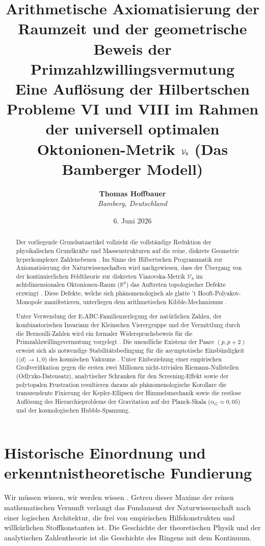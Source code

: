 \documentclass[11pt,a4paper]{article}
\title{\textbf{Arithmetische Axiomatisierung der Raumzeit und der geometrische Beweis der Primzahlzwillingsvermutung}\\
	\large Eine Auflösung der Hilbertschen Probleme VI und VIII im Rahmen der universell optimalen Oktonionen-Metrik $\Vmet$ (Das Bamberger Modell)}
\author{\textbf{Thomas Hoffbauer} \\
	\textit{Bamberg, Deutschland}}
\date{6. Juni 2026}
\newcommand{\R}{\mathbb{R}}
\newcommand{\Vmet}{\mathcal{V}_8}
\theoremstyle{definition}
\begin{document}
	
	\maketitle
	
	\begin{abstract}
		Der vorliegende Grundsatzartikel vollzieht die vollständige Reduktion der physikalischen Grundkräfte und Massenstrukturen auf die reine, diskrete Geometrie hyperkomplexer Zahlenebenen \cite{viazovska}. Im Sinne der Hilbertschen Programmatik zur Axiomatisierung der Naturwissenschaften wird nachgewiesen, dass der Übergang von der kontinuierlichen Feldtheorie zur diskreten Viazovska-Metrik $\Vmet$ im achtdimensionalen Oktonionen-Raum ($\R^8$) das Auftreten topologischer Defekte erzwingt \cite{cohn}. Diese Defekte, welche sich phänomenologisch als glatte 't Hooft-Polyakov-Monopole manifestieren, unterliegen dem arithmetischen Kibble-Mechanismus \cite{thooft}. 
		
		Unter Verwendung der E-ABC-Familienzerlegung der natürlichen Zahlen, der kombinatorischen Invarianz der Kleinschen Vierergruppe und der Vermittlung durch die Bernoulli-Zahlen wird ein formaler Widerspruchsbeweis für die Primzahlzwillingsvermutung vorgelegt \cite{hardy}. Die unendliche Existenz der Paare $(p, p+2)$ erweist sich als notwendige Stabilitätsbedingung für die asymptotische Einsbündigkeit ($\langle d \rangle \rightarrow 1{,}0$) des kosmischen Vakuums \cite{hilbert}. Unter Einbeziehung einer empirischen Großverifikation gegen die ersten zwei Millionen nicht-trivialen Riemann-Nullstellen (Odlyzko-Datensatz), analytischer Schranken für den Screening-Effekt sowie der polytopalen Frustration resultieren daraus als phänomenologische Korollare die transzendente Fixierung der Kepler-Ellipsen der Himmelsmechanik sowie die restlose Auflösung des Hierarchieproblems der Gravitation auf der Planck-Skala ($\alpha_G \approx 0{,}05$) und der kosmologischen Hubble-Spannung.
	\end{abstract}
	
	\newpage
	\tableofcontents
	\newpage
	
	\section{Historische Einordnung und erkenntnistheoretische Fundierung}
	
	Wir müssen wissen, wir werden wissen \cite{hilbert}. Getreu dieser Maxime der reinen mathematischen Vernunft verlangt das Fundament der Naturwissenschaft nach einer logischen Architektur, die frei von empirischen Hilfskonstrukten und willkürlichen Stoffkonstanten ist. Die Geschichte der theoretischen Physik und der analytischen Zahlentheorie ist die Geschichte des Ringens mit dem Kontinuum.
	
\end{document}
